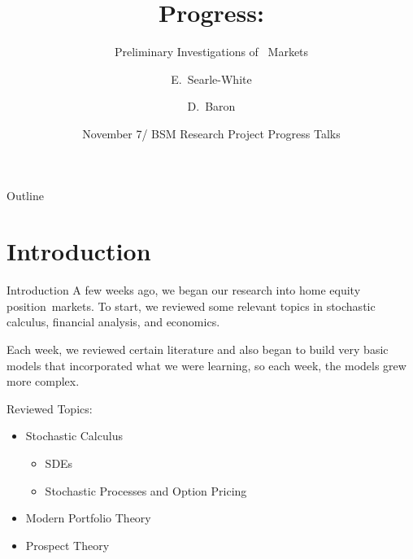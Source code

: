 \documentclass{beamer}
\title[Progress] %
{Progress:}
\subtitle
{Preliminary Investigations of \HEP\ Markets } %
\author[Searle-White, Baron] %
{E.~Searle-White\inst{1} \and D.~Baron\inst{2}}
\institute %
{
\inst{1}%
Mills College
\and
\inst{2}%
Western Washington University
}
\date[EUR Introduction] %
{November 7/ BSM Research Project Progress Talks}
\newcommand{\hep}{home equity position}
\begin{document}
\begin{frame}
\titlepage
\end{frame}


\begin{frame}{Outline}
\tableofcontents
\end{frame}






%


\section{Introduction}


\begin{frame}{Introduction}
A few weeks ago, we began our research into \hep\ markets. To start, we reviewed some relevant topics in stochastic calculus, financial analysis, and economics.\bigskip

Each week, we reviewed certain literature and also began to build very basic models that incorporated what we were learning, so each week, the models grew more complex.
\end{frame}

\begin{frame}
Reviewed Topics:
\begin{itemize}
\item
Stochastic Calculus
\begin{itemize}
\item 
SDEs
\item
Stochastic Processes and Option Pricing
\end{itemize}
\item
Modern Portfolio Theory
\item 
Prospect Theory
\end{itemize}
\end{frame}
\end{document}
